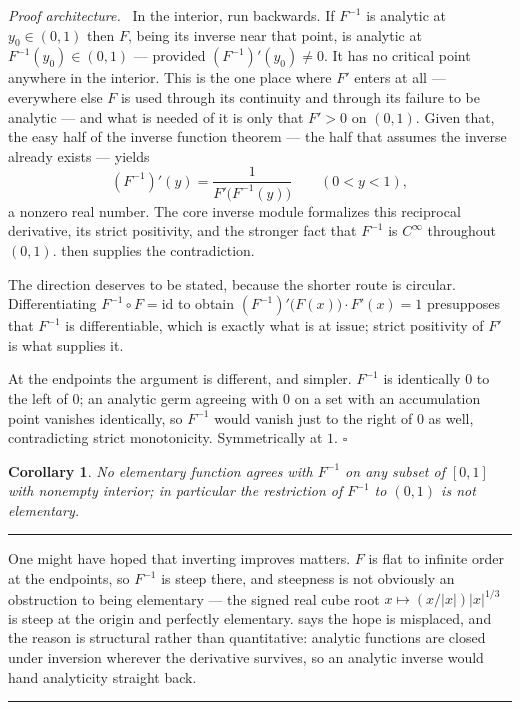 \documentclass[11pt,oneside]{article}
\newtheorem{corollary}[theorem]{Corollary}
\theoremstyle{definition}
\theoremstyle{remark}
\newenvironment{proofidea}{\par\smallskip\noindent\textit{Proof architecture.}\ }{\hfill$\square$\par\smallskip}
\newenvironment{boxedremark}{%
  \par\smallskip\noindent\begin{center}\begin{minipage}{0.94\textwidth}%
  \color{black}\hrule\vspace{0.6em}\small
}{%
  \vspace{0.6em}\hrule\end{minipage}\end{center}\smallskip
}
\begin{document}
\begin{proofidea}
In the interior, run  backwards.  If $F^{-1}$ is analytic at
$y_0\in(0,1)$ then $F$, being its inverse near that point, is analytic at
$F^{-1}(y_0)\in(0,1)$ --- provided $(F^{-1})'(y_0)\ne0$.  It has no critical
point anywhere in the interior.  This is the one place where $F'$ enters at
all --- everywhere else
$F$ is used through its continuity and through its failure to be analytic ---
and what is needed of it is only that $F'>0$ on $(0,1)$.  Given that, the easy
half of the inverse function theorem --- the half that assumes the inverse
already exists --- yields
 \[
   (F^{-1})'(y)=\frac{1}{F'\bigl(F^{-1}(y)\bigr)}\qquad(0<y<1),
 \]
 a nonzero real number.  The core inverse module formalizes this reciprocal
 derivative, its strict positivity, and the stronger fact that $F^{-1}$ is
 $C^\infty$ throughout $(0,1)$.   then supplies the
 contradiction.

The direction deserves to be stated, because the shorter route is circular.
Differentiating $F^{-1}\circ F=\mathrm{id}$ to obtain
$(F^{-1})'\bigl(F(x)\bigr)\cdot F'(x)=1$ presupposes that $F^{-1}$ is
differentiable, which is exactly what is at issue; strict positivity of $F'$
is what supplies it.

At the endpoints the argument is different, and simpler.  $F^{-1}$ is
identically $0$ to the left of $0$; an analytic germ agreeing with $0$ on a
set with an accumulation point vanishes identically, so $F^{-1}$ would vanish
just to the right of $0$ as well, contradicting strict monotonicity.
Symmetrically at $1$.
\end{proofidea}

\begin{corollary}\label{cor:invmain}
No elementary function agrees with $F^{-1}$ on any subset of $[0,1]$ with
nonempty interior; in particular the restriction of $F^{-1}$ to $(0,1)$ is not
elementary.
\end{corollary}

\begin{boxedremark}
One might have hoped that inverting improves matters.  $F$ is flat to infinite
order at the endpoints, so $F^{-1}$ is steep there, and steepness is not
obviously an obstruction to being elementary --- the signed real cube root
$x\mapsto (x/|x|)|x|^{1/3}$ is steep at the origin and perfectly elementary.
 says the hope
is misplaced, and the reason is structural rather than quantitative: analytic
functions are closed under inversion wherever the derivative survives, so an
analytic inverse would hand analyticity straight back.
\end{boxedremark}
\end{document}
